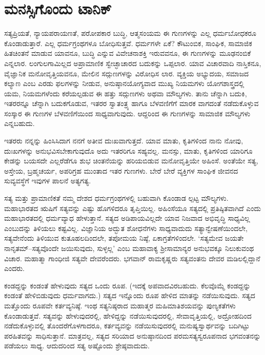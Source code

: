 \vskip 3pt


\section*{ಮನಸ್ಸಿಗೊಂದು ಟಾನಿಕ್​}


ಸತ್ಯಪ್ರಿಯತೆ, ನ್ಯಾಯಪರಾಯಣತೆ, ಪರೋಪಕಾರ ಬುದ್ಧಿ, ಆತ್ಮಸಂಯಮ ಈ ಗುಣಗಳನ್ನು ಎಲ್ಲ ಧರ್ಮಬೋಧಕರೂ ಕೊಂಡಾಡುತ್ತಾರೆ. ಎಲ್ಲ ಧರ್ಮಗ್ರಂಥಗಳೂ ಬೋಧಿಸುತ್ತವೆ. ಧರ್ಮಗಳೇ ಏಕೆ? ಕೌಟುಂಬಿಕ, ಸಾಂಘಿಕ, ಸಾಮಾಜಿಕ ಹಿತಚಿಂತನೆ ಮಾಡುವ ಯಾವನೂ, ಬುದ್ಧಿ ಎನ್ನುವ ವಿವೇಚನಾಶಕ್ತಿ ಇರುವವನೂ, ಈ ಗುಣಗಳನ್ನು ಮೂಢನಂಬಿಕೆ ಎನ್ನಲಾರ. ಲಂಗುಲಗಾಮಿಲ್ಲದ ಅಪ್ರಾಮಾಣಿಕ ಸ್ವೇಚ್ಛಾಚಾರದ ಬದುಕನ್ನು ಒಪ್ಪಲಾರ. ಯಾವ ವಿಚಾರವಾದಿ ನಾಸ್ತಿಕನೂ, ವೈಜ್ಞಾನಿಕ ಮನೋವೃತ್ತಿಯವನೂ, ಮೇಲಿನ ಸದ್ಗುಣಗಳನ್ನು ವಿರೋಧಿಸ ಲಾರ. ವ್ಯಕ್ತಿಯ ಅಭ್ಯುದಯ, ಸಮಾಜದ ಕಲ್ಯಾಣ ಎಂಬ ಎರಡು ಫಲಗಳನ್ನು ನೀಡುವ, ಅನುಷ್ಠಾನಯೋಗ್ಯವಾದ ಮುಖ್ಯ ನಿಯಮಗಳು ಯೋಗಶಾಸ್ತ್ರದಲ್ಲಿ ಯಮ, ನಿಯಮಗಳೆಂದು ಕರೆಯಲ್ಪಡುವ ಈ ಹತ್ತು ಸದ್ಗುಣಗಳು ಅಥವಾ ಮೌಲ್ಯಗಳು. ತಾನು ಚೆನ್ನಾಗಿ ಬದುಕಿ, ಇತರರನ್ನೂ ಚೆನ್ನಾಗಿ ಬದುಕಗೊಡುವ, ಇತರರ ಸ್ವಾತಂತ್ರ್ಯ ಹಾಗೂ ಬೆಳವಣಿಗೆಗೆ ಮಾರಕ ವಾಗದಂತೆ ನಡೆದುಕೊಳ್ಳುವ ಸಂಸ್ಕಾರ ಈ ಗುಣಗಳ ಬೆಳವಣಿಗೆಯಿಂದ ಸಾಧ್ಯವಾಗುವುದು. ಆದ್ದರಿಂದ ಈ ಗುಣಗಳನ್ನು ಸಾಮಾಜಿಕ ಮೌಲ್ಯಗಳು ಎನ್ನಬಹುದು.

\vskip 3pt

ಇತರರು ನನ್ನನ್ನು ಹಿಂಸಿಸಿದಾಗ ನನಗೆ ಅತೀವ ದುಃಖವಾಗುತ್ತದೆ. ಯಾವ ಮಾತು, ಕೃತಿಗಳಿಂದ ನಾನು ನೋವು, ದುಃಖಗಳನ್ನು ಅನುಭವಿಸಬೇಕಾಗುವುದೊ ಅದು ಇತರರಿಗೂ ಸಹ್ಯವಲ್ಲ. ಮನಸ್ಸು, ಮಾತು, ಕೃತಿಗಳಿಂದ ಯಾರಿಗೂ ಕೇಡನ್ನು ಬಯಸದೇ ಎಲ್ಲರೆಡೆಗೂ ಶುಭ ಚಿಂತನೆಯನ್ನು ಹರಿಯಬಿಡುವ ಮನೋವೃತ್ತಿಯೇ ಅಹಿಂಸೆ. ಅಂತೆಯೇ ಸತ್ಯ, ಅಸ್ತೇಯ, ಬ್ರಹ್ಮಚರ್ಯ, ಅಪರಿಗ್ರಹ ಮುಂತಾದ ಇತರ ಗುಣಗಳು. ಬೇರೆ ಬೇರೆ ವ್ಯಕ್ತಿಗಳ ಸಾಂಘಿಕ ಜೀವನದ ಸುವ್ಯವಸ್ಥೆಗೆ ಇವುಗಳ ಪಾಲನೆ ಅತ್ಯಗತ್ಯ.

ಸತ್ಯ ಮತ್ತು ಪ್ರಾಮಾಣಿಕತೆ ನಮ್ಮ ದೇಶದ ಧರ್ಮಗ್ರಂಥಗಳಲ್ಲಿ ಬಹುವಾಗಿ ಕೊಂಡಾಡ ಲ್ಪಟ್ಟ ಮೌಲ್ಯಗಳು. ಮಹಾಭಾರತದ ಋಷಿಗೆ ಸತ್ಯವನ್ನು ಎಷ್ಟು ಹೊಗಳಿದರೂ ತೃಪ್ತಿಯಿಲ್ಲ. ಅಹಿಂಸೆಯೂ ಸತ್ಯದಲ್ಲಿ ಪ್ರತಿಷ್ಠಿತವಾಗಿದೆ ಎಂದು ಮಹಾಭಾರತದಲ್ಲಿ ಧರ್ಮವ್ಯಾಧ ಹೇಳುತ್ತಾನೆ. ಸತ್ಯದ ಅಡಿಪಾಯವಿಲ್ಲದೇ ಯಾವ ನಿಜವಾದ ಅಭಿವೃದ್ಧಿ ಸಾಧ್ಯವಿಲ್ಲ ಎಂಬುದನ್ನು ತಿಳಿಯಲು ಕಷ್ಟವಿಲ್ಲ. ವಿಜ್ಞಾನಿಯ ಅದ್ಭುತ ಶೋಧನೆಗಳು ಸಾಧ್ಯವಾದುದು ಸತ್ಯಾನ್ವೇಷಣೆಯಿಂದಲೇ, ಸತ್ಯವೇನೆಂದು ತಿಳಿಯುವ ಕುತೂಹಲದಿಂದಲೇ, ತಪೋಮಯ ನಿಷ್ಠೆ, ಏಕಾಗ್ರತೆಗಳಿಂದಲೇ. ‘ಸತ್ಯಮೇವ ಜಯತೇ ನಾನೃತಮ್​–ಸತ್ಯವೊಂದೇ ಜಯಿಸುವುದು, ಸುಳ್ಳಲ್ಲ’ ಎಂಬ ಮಹಾವಾಕ್ಯ ಶ‍್ರೀಸಾಮಾನ್ಯರ ಅನುಭವಕ್ಕೂ ನಿಲುಕುವಂಥ ವಿಚಾರ. ಮಹಾತ್ಮಾ ಗಾಂಧೀಜಿ ಸತ್ಯವೇ ದೇವರೆಂದರು. ಭಗವಾನ್ ರಾಮಕೃಷ್ಣರು ಸತ್ಯವಂತನು ದೇವರ ಮಡಿಲಲ್ಲಿದ್ದಾನೆ ಎಂದರು.

ಕಂಡದ್ದನ್ನು ಕಂಡಂತೆ ಹೇಳುವುದು ಸತ್ಯದ ಒಂದು ರೂಪ. (ಇದಕ್ಕೆ ಅಪವಾದವಿರಬಹುದು. ಕೆಲವೊಮ್ಮೆ ಕಂಡದ್ದನ್ನು ಕಂಡಂತೆ ಹೇಳಿಬಿಡುವುದು ಧರ್ಮವಾಗದು.) ಸತ್ಯದ ಇನ್ನೊಂದು ರೂಪ ಹೇಳಿದ ಮಾತನ್ನು ನಡೆಯಿಸುವುದು. ಸತ್ಯದ ಮತ್ತೊಂದು ರೂಪವೇ ಕರ್ತವ್ಯನಿಷ್ಠೆ. ಇಂಥ ಸತ್ಯನಿಷ್ಠರಾದ ಮಹಾತ್ಮರ ಮಹಿಮಾತಿಶಯವನ್ನು ಪುಣ್ಯಕತೆಗಳು ಕೊಂಡಾಡುತ್ತವೆ. ಸತ್ಯವನ್ನು ಹೇಳುವುದರಲ್ಲಿ, ಹೇಳಿದ್ದನ್ನು ನಡೆಯಿಸುವುದರಲ್ಲಿ, ಸೇವಾವೃತ್ತಿಯಲ್ಲಿ, ಅದ್ರೋಹದಿಂದ ನಡೆದುಕೊಳ್ಳುವಲ್ಲಿ ತೊಂದರೆಗೊಳಗಾದರೂ, ಕರ್ತವ್ಯವನ್ನು ನಡೆಯಿಸುವುದರಲ್ಲಿ ಮನುಷ್ಯ\break ಸ್ವಾರ್ಥವನ್ನು ಬದಿಗಿಟ್ಟು ಪರಹಿತವನ್ನು ಸಾಧಿಸುತ್ತಾನೆ. ಮಾತ್ರವಲ್ಲ, ಸತ್ಯದ ಸರಿಯಾದ ಅನುಷ್ಠಾನದಿಂದ ಪರಮಸತ್ಯಸ್ವರೂಪನಾದ ಭಗವಂತನನ್ನು ಪಡೆಯಲು ಸಾಧ್ಯ. ಆದುದರಿಂದ ಸತ್ಯ ಅಷ್ಟೊಂದು ಶ್ರೇಷ್ಠವಾದುದು.

